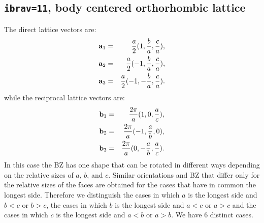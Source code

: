 \documentclass[12pt,a4paper]{article}
\begin{document}
\subsection{\texttt{ibrav=11}, body centered orthorhombic lattice}
The direct lattice vectors are:
\begin{eqnarray}
{\bf a}_1 &=& {a \over 2} (1, {b \over a}, {c \over a}), \nonumber \\
{\bf a}_2 &=& {a \over 2} (-1, {b \over a}, {c \over a}), \nonumber \\
{\bf a}_3 &=& {a \over 2} (-1, -{b \over a}, {c \over a}). \nonumber
\nonumber
\end{eqnarray}
while the reciprocal lattice vectors are:
\begin{eqnarray}
{\bf b}_1 &=& {2\pi \over a} (1, 0, {a \over c}), \nonumber \\
{\bf b}_2 &=& {2\pi \over a} (-1, {a \over b}, 0), \nonumber \\
{\bf b}_3 &=& {2\pi \over a} (0, -{a \over b}, {a \over c}). \nonumber
\nonumber
\end{eqnarray}
In this case the BZ has one shape that can be rotated in
different ways depending on the relative sizes of $a$, $b$, and $c$.
Similar orientations and BZ that differ only for the relative sizes of
the faces are obtained for the cases that have in common the longest side.
Therefore we distinguish the cases in which $a$ is the longest side 
and $b<c$ or $b>c$, the cases in which $b$ is the longest side and
$a<c$ or $a>c$ and the cases in which $c$ is the longest side and $a<b$
or $a>b$. We have $6$ distinct cases.
\end{document}
